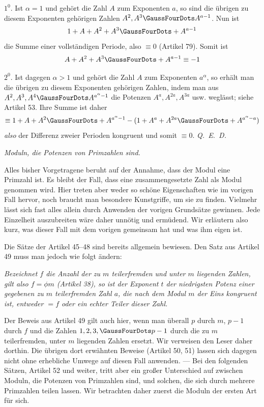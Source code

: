 $1^0$. Ist $\alpha=1$ und gehört die Zahl $A$ zum Exponenten $a$, so sind die übrigen zu diesem Exponenten gehörigen Zahlen $A^2,A^3\GaussFourDots A^{a-1}$. Nun ist
\[1+A+A^2+A^3\GaussFourDots+A^{a-1}\]
die Summe einer vollständigen Periode, also $\equiv0$ (Artikel 79). Somit ist
\[A+A^2+A^3\GaussFourDots+A^{a-1}\equiv-1\]

$2^0$. Ist dagegen $\alpha>1$ und gehört die Zahl $A$ zum Exponenten $a^{\alpha}$, so erhält man die übrigen zu diesem Exponenten gehörigen Zahlen, indem man aus $A^2,A^3,A^4\GaussFourDots A^{a^{\alpha}-1}$ die Potenzen $A^a,A^{2a},A^{3a}$ usw. weglässt; siehe Artikel 53. Ihre Summe ist daher
\[\equiv1+A+A^2\GaussFourDots+A^{a^{\alpha}-1}-(1+A^a+A^{2a}\GaussFourDots+A^{a^{\alpha}-a})\]
\emph{also} der Differenz zweier Perioden kongruent und somit $\equiv0$. \mbox{\emph{Q. E. D.}}

\begin{center}\emph{Moduln, die Potenzen von Primzahlen sind.}\end{center}

Alles bisher Vorgetragene beruht auf der Annahme, dass der Modul eine Primzahl ist. Es bleibt der Fall, dass eine zusammengesetzte Zahl als Modul genommen wird. Hier treten aber weder so schöne Eigenschaften wie im vorigen Fall hervor, noch braucht man besondere Kunstgriffe, um sie zu finden. Vielmehr lässt sich fast alles allein durch Anwenden der vorigen Grundsätze gewinnen. Jede Einzelheit auszubreiten wäre daher unnötig und ermüdend. Wir erläutern also kurz, was dieser Fall mit dem vorigen gemeinsam hat und was ihm eigen ist.

Die Sätze der Artikel 45–48 sind bereits allgemein bewiesen. Den Satz aus Artikel 49 muss man jedoch wie folgt ändern:

\emph{Bezeichnet $f$ die Anzahl der zu $m$ teilerfremden und unter $m$ liegenden Zahlen, gilt also $f=\phi m$ (Artikel 38), so ist der Exponent $t$ der niedrigsten Potenz einer gegebenen zu $m$ teilerfremden Zahl $a$, die nach dem Modul $m$ der Eins kongruent ist, entweder $=f$ oder ein echter Teiler dieser Zahl.}

Der Beweis aus Artikel 49 gilt auch hier, wenn man überall $p$ durch $m$, $p-1$ durch $f$ und die Zahlen $1,2,3,\GaussFourDots p-1$ durch die zu $m$ teilerfremden, unter $m$ liegenden Zahlen ersetzt. Wir verweisen den Leser daher dorthin. Die übrigen dort erwähnten Beweise (Artikel 50, 51) lassen sich dagegen nicht ohne erhebliche Umwege auf diesen Fall anwenden. --- Bei den folgenden Sätzen, Artikel 52 und weiter, tritt aber ein großer Unterschied auf zwischen Moduln, die Potenzen von Primzahlen sind, und solchen, die sich durch mehrere Primzahlen teilen lassen. Wir betrachten daher zuerst die Moduln der ersten Art für sich.

